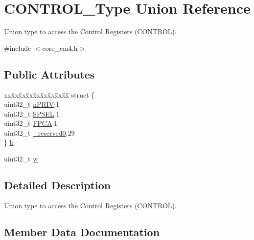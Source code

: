 \hypertarget{union_c_o_n_t_r_o_l___type}{}\section{C\+O\+N\+T\+R\+O\+L\+\_\+\+Type Union Reference}
\label{union_c_o_n_t_r_o_l___type}


Union type to access the Control Registers (C\+O\+N\+T\+R\+OL).  




{\ttfamily \#include $<$core\+\_\+cm4.\+h$>$}

\subsection*{Public Attributes}
\begin{DoxyCompactItemize}
\item 
\begin{tabbing}
xx\=xx\=xx\=xx\=xx\=xx\=xx\=xx\=xx\=\kill
struct \{\\
\>uint32\_t \hyperlink{union_c_o_n_t_r_o_l___type_a35c1732cf153b7b5c4bd321cf1de9605}{nPRIV}:1\\
\>uint32\_t \hyperlink{union_c_o_n_t_r_o_l___type_a8cc085fea1c50a8bd9adea63931ee8e2}{SPSEL}:1\\
\>uint32\_t \hyperlink{union_c_o_n_t_r_o_l___type_ac62cfff08e6f055e0101785bad7094cd}{FPCA}:1\\
\>uint32\_t \hyperlink{union_c_o_n_t_r_o_l___type_af8c314273a1e4970a5671bd7f8184f50}{\_reserved0}:29\\
\} \hyperlink{union_c_o_n_t_r_o_l___type_adc6a38ab2980d0e9577b5a871da14eb9}{b}\\

\end{tabbing}\item 
uint32\+\_\+t \hyperlink{union_c_o_n_t_r_o_l___type_a6b642cca3d96da660b1198c133ca2a1f}{w}
\end{DoxyCompactItemize}


\subsection{Detailed Description}
Union type to access the Control Registers (C\+O\+N\+T\+R\+OL). 

\subsection{Member Data Documentation}
